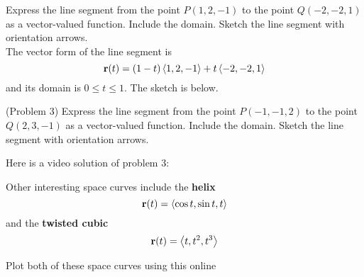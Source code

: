 \documentclass[handout]{ximera}
\begin{document}
\begin{example}[Example 3]
Express the line segment from the point $P(1, 2, -1)$ to the point $Q(-2, -2, 1)$ as a vector-valued function.  
Include the domain. Sketch the line segment with orientation arrows.\\
The vector form of the line segment is
\[
\mathbf r(t) = (1-t)\left\langle 1, 2, -1\right\rangle + t \left\langle -2, -2, 1\right\rangle
\]
and its domain is $0 \leq t \leq 1$. The sketch is below.




\begin{image}
\end{image}


\end{example}



\begin{problem}(Problem 3)
Express the line segment from the point $P(-1, -1, 2)$ to the point $Q(2, 3, -1)$ as a vector-valued function.  
Include the domain. Sketch the line segment with orientation arrows.
\end{problem}

Here is a video solution of problem 3:\\
\begin{foldable}
\end{foldable}

Other interesting space curves include the \textbf{helix}
\[
\mathbf r(t) = \left\langle \cos t, \sin t, t\right\rangle
\]
and the \textbf{twisted cubic}
\[
\mathbf r(t) = \left\langle t, t^2, t^3\right\rangle
\]

Plot both of these space curves using this online 
\end{document}
